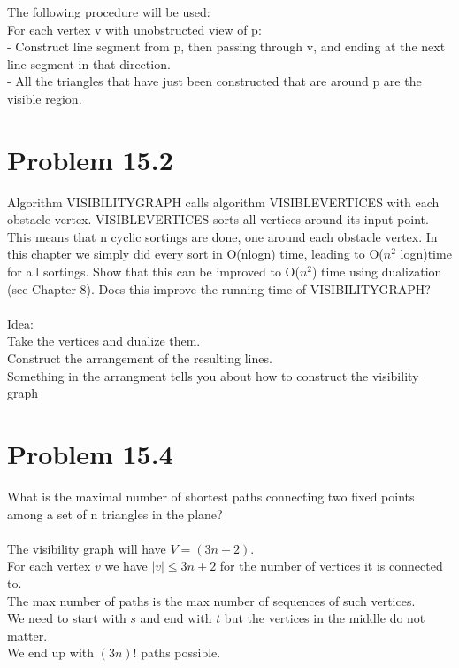 \documentclass[11pt,psfig]{article}
\begin{document}
The following procedure will be used:\\
For each vertex v with unobstructed view of p:\\
- Construct line segment from p, then passing through v, and ending at the next line segment in that direction. \\
- All the triangles that have just been constructed that are around p are the visible region. 

\newpage

\section*{Problem 15.2}

Algorithm VISIBILITYGRAPH calls algorithm VISIBLEVERTICES with
each obstacle vertex. VISIBLEVERTICES sorts all vertices around its
input point. This means that n cyclic sortings are done, one around each
obstacle vertex. In this chapter we simply did every sort in O(nlogn)
time, leading to O($n^2$ logn)time for all sortings. Show that this can be
improved to O($n^2$) time using dualization (see Chapter 8). Does this
improve the running time of VISIBILITYGRAPH?\\
\\
Idea:\\
Take the vertices and dualize them. \\
Construct the arrangement of the resulting lines. \\
Something in the arrangment tells you about how to construct the visibility graph

\newpage

\section*{Problem 15.4}

What is the maximal number of shortest paths connecting two ﬁxed
points among a set of n triangles in the plane?\\
\\
The visibility graph will have $V = (3n+2)$.\\
For each vertex $v$ we have $|v| \leq 3n + 2$ for the number of vertices it is connected to. \\
The max number of paths is the max number of sequences of such vertices. \\
We need to start with $s$ and end with $t$ but the vertices in the middle do not matter. \\
We end up with $(3n)!$ paths possible. 
\end{document}
